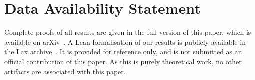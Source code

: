 \section*{Data Availability Statement}

\iffullversion\else
Complete proofs of all results are given in the full version of this paper, which is available on arXiv~\cite{fullversion}.
\fi
A Lean formalisation of our results is publicly available in the Lax archive~\cite{lax-149335}. It is provided for reference only, and is not submitted as an official contribution of this paper. As this is purely theoretical work, no other artifacts are associated with this paper.